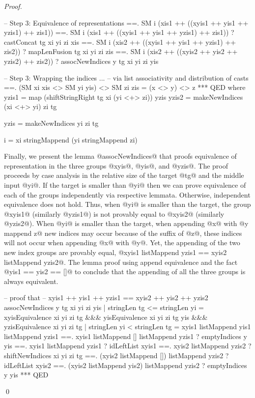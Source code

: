 \begin{proof}
\begin{code}
  -- Step 3: Equivalence of representations
  ==. SM i (xis1 ++ ((xyis1 ++ yis1 ++ yzis1) ++ zis1))
  ==. SM i (xis1 ++ ((xyis1 ++ yis1 ++ yzis1) ++ zis1))
      ? castConcat tg xi yi zi xis
  ==. SM i (xis2 ++ ((xyis1 ++ yis1 ++ yzis1) ++ zis2))
      ? mapLenFusion tg xi yi zi zis
  ==. SM i (xis2 ++ ((xyis2 ++ yis2 ++ yzis2) ++ zis2))
      ? assocNewIndices y tg xi yi zi yis

  -- Step 3: Wrapping the indices
                         ...
  -- via list associativity and distribution of casts
  ==. (SM xi xis <> SM yi yis) <> SM zi zis
  =   (x <> y) <> z
  *** QED
  where
    yzis1 = map (shiftStringRight tg xi (yi <+> zi)) yzis
    yzis2 = makeNewIndices (xi <+> yi) zi tg

    yzis  = makeNewIndices yi zi tg

    i     = xi stringMappend (yi stringMappend zi)
\end{code}
Finally, we present the lemma @assocNewIndices@
that proofs equivalence of representation in the three
groups @xyis@, @yis@, and @yzis@.
The proof proceeds by case analysis in the relative size of
the target @tg@ and the middle input @yi@.
%
If the target is smaller than @yi@
then we can prove equivalence of each of the groups independently
via respective lemmata.
%
Otherwise, independent equivalence does not hold.
Thus, when @yi@ is smaller than the target,
the group @xyis1@ (similarly @yzis1@)
is not provably equal to @xyis2@ (similarly @yzis2@).
When @yi@ is smaller than the target,
when appending @x@ with @y mappend z@ new indices may occur because
of the suffix of @z@, these indices will not occur when appending @x@ with @y@.
%
Yet, the appending of the two new index groups are provably equal,
@xyis1 listMappend yzis1 == xyis2 listMappend yzis2@.
The lemma proof using append equivalence and the fact @yis1 == yis2 == []@
to conclude that the appending of all the three groups is always equivalent.

\begin{code}
-- proof that
-- xyis1 ++ yis1 ++ yzis1 == xyis2 ++ yis2 ++ yzis2
assocNewIndices y tg xi yi zi yis
  | stringLen tg <= stringLen yi
  =   xyisEquivalence xi yi zi tg
  &&&  yisEquivalence xi yi zi tg yis
  &&& yzisEquivalence xi yi zi tg
  | stringLen yi < stringLen tg
  =  xyis1 listMappend yis1 listMappend yzis1
  ==. xyis1 listMappend [] listMappend yzis1 ? emptyIndices y yis
  ==. xyis1 listMappend yzis1 ? idLeftList xyis1
  ==. xyis2 listMappend yzis2 ? shiftNewIndices xi yi zi tg
  ==. (xyis2 listMappend []) listMappend yzis2 ? idLeftList xyis2
  ==. (xyis2 listMappend yis2) listMappend yzis2 ? emptyIndices y yis
  *** QED
\end{code}


\qed\end{proof}
